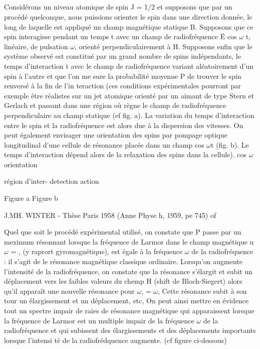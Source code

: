 \subsection{}%
Considérons un niveau atomique de spin J = 1/2 et supposons que
par un procédé quelconque, nous puissions orienter le spin dans une direction donnée, le long de laquelle est appliqué un champ magnétique statique
B. Supposons que ce spin interagisse pendant un temps t avec un champ de
radiofréquence Ë cos $\omega$ t, linéaire, de pulsation $\omega$, orienté perpendiculairement à H. Supposons enfin que le système observé est constitué par un
grand nombre de spins indépendants, le temps d'interaction t avec le champ
de radiofréquence variant aléatoirement d'un spin à l'autre et que l'on me
sure la probabilité moyenne P de trouver le spin renversé à la fin de l'in
teraction (ces conditions expérimentales pourront par exemple être réalistes
sur un jet atomique orienté par un aimant de type Stern et Gerlach et passant
dans une région où règne le champ de radiofréquence perpendiculaire au champ
statique (ef fig. a). La variation du temps d'interaction entre le spin et
la radiofréquence est alors due à la dispersion des vitesses. On peut également envisager une orientation des spins par pompage optique longitudinal
d'une cellule de résonance placée dans un champ cos $\omega$t (fig. b). Le
temps d'interaction dépend alors de la relaxation des spins dans la cellule).
cos $\omega$
orientation

région d'inter- detection
action

Figure a Figure b

J.MH. WINTER - Thèse Paris 1958 (Anne Physe h, 1959, pe 745) of

 

Quel que soit le procédé expérimental utilisé, on constate que P
passe par un meximum résonnant lorsque la fréquence de Larmor dans le champ
magnétique  u$\omega$ = , (y raprort gyromagnétique), est égale à la fréquence
$\omega$ de la radiofréquence : il s'agit de le résonance magnétique classique ordinaire. Lorsqu'on augmente l'intensité de la radiofréquence, on constate que
la résonance  s'élargit et subit un déplacement vers les faibles valeurs du chemp H (shift de Bloch-Siegert) alors qu'il apparaît une nouvelle
résonance pour $\omega$, = $\omega$, Cette résonance subit à son tour un élargissement et
un déplacement, etc, On peut ainsi mettre en évidence tout un spectre impair
de raies de résonance magnétique qui apparaissent lorsque la fréquence de
Larmor est un multiple impair de la fréquence $\omega$ de la radiofréquence et qui
subissent des élargissements et des déplacements importants lorsque l'intensi
té de la radiofrédquence augmente. (cf figure ci-dessous)

